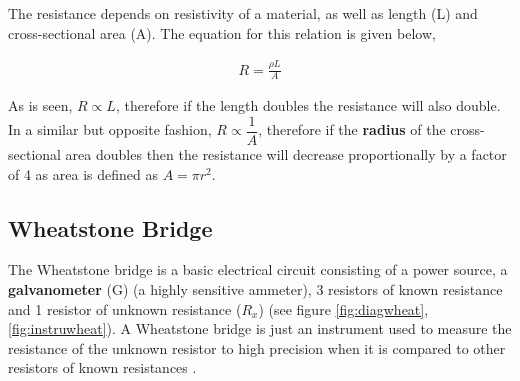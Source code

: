 \documentclass[12pt]{article}
\begin{document}
The resistance depends on resistivity of a material, as well as length (L) and cross-sectional area (A). The equation for this relation is given below,

\vspace{-2ex}
\begin{gather} \label{eq:0}
    R = \frac{\rho L}{A}
\end{gather}

As is seen, $R \propto L$, therefore if the length doubles the resistance will also double. In a similar but opposite fashion, $R \propto \dfrac{1}{A}$, therefore if the
\textbf{radius} of the cross-sectional area doubles then the resistance will decrease proportionally by a factor of 4 as area is defined as $A = \pi r^2$.

\subsection{Wheatstone Bridge}

The Wheatstone bridge is a basic electrical circuit consisting of a power source, a \textbf{galvanometer} (G) (a highly sensitive ammeter), 3 resistors of
known resistance and 1 resistor of unknown resistance ($R_x$) (see figure \ref{fig:diagwheat}, \ref{fig:instruwheat}). A Wheatstone bridge is just an instrument used
to measure the resistance of the unknown resistor to high precision when it is compared to other resistors of known resistances \cite{allenwheat, librewheat}.
\end{document}
